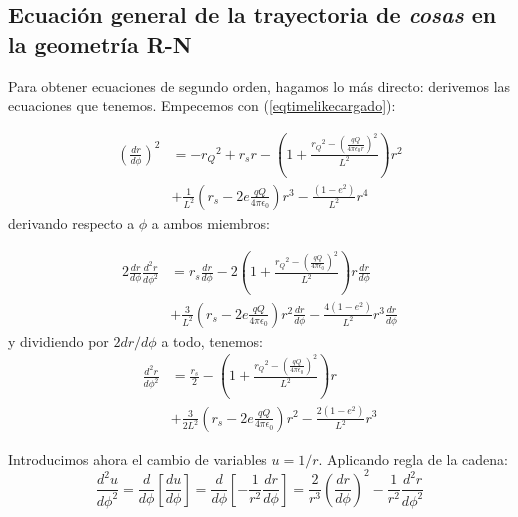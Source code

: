 \subsection*{\textbf{Ecuación general de la trayectoria de \textit{cosas} en la geometría R-N}}
Para obtener ecuaciones de segundo orden, hagamos lo más directo: derivemos las ecuaciones que tenemos. Empecemos con (\ref{eqtimelikecargado}):

\begin{equation}
\begin{split}
    \left( \frac{dr}{d\phi} \right)^2 &=-{r_Q}^2 + r_s r - \left( 1 + \frac{{r_Q}^2 - \left(\frac{qQ}{4\pi\epsilon_0 r}\right)^2}{L^2} \right) r^2 \\ &+ \frac{1}{L^2} \left(r_s - 2e\frac{qQ}{4\pi\epsilon_0}\right)r^3 - \frac{(1-e^2)}{L^2}r^4
\end{split}
\end{equation}
derivando respecto a $\phi$ a ambos miembros:

\begin{equation}
\begin{split}
    2 \frac{dr}{d\phi} \frac{d^2r}{d\phi^2} &=r_s \frac{dr}{d\phi} - 2 \left( 1 + \frac{{r_Q}^2 - \left(\frac{qQ}{4\pi\epsilon_0}\right)^2}{L^2} \right) r \frac{dr}{d\phi} \\ &+ \frac{3}{L^2} \left(r_s - 2e\frac{qQ}{4\pi\epsilon_0}\right)r^2\frac{dr}{d\phi} - \frac{4(1-e^2)}{L^2}r^3\frac{dr}{d\phi}
\end{split}
\end{equation}
y dividiendo por $2dr/d\phi$ a todo, tenemos:
\begin{equation}
\begin{split}
    \frac{d^2r}{d\phi^2} &= \frac{r_s}{2} - \left( 1 + \frac{{r_Q}^2 - \left(\frac{qQ}{4\pi\epsilon_0}\right)^2}{L^2} \right) r \\ &+ \frac{3}{2 L^2} \left(r_s - 2e\frac{qQ}{4\pi\epsilon_0}\right)r^2 - \frac{2(1-e^2)}{L^2}r^3
\end{split}
\label{eqrsegunda}
\end{equation}

Introducimos ahora el cambio de variables $u=1/r$. Aplicando regla de la cadena:
\begin{equation}
    \frac{d^2 u}{d \phi^2} = \frac{d}{d \phi} \left[ \frac{du}{d\phi} \right] = \frac{d}{d \phi} \left[ -\frac{1}{r^2} \frac{dr}{d\phi} \right] = \frac{2}{r^3} \left( \frac{dr}{d\phi} \right)^2 - \frac{1}{r^2} \frac{d^2 r}{d\phi^2}
\end{equation}

